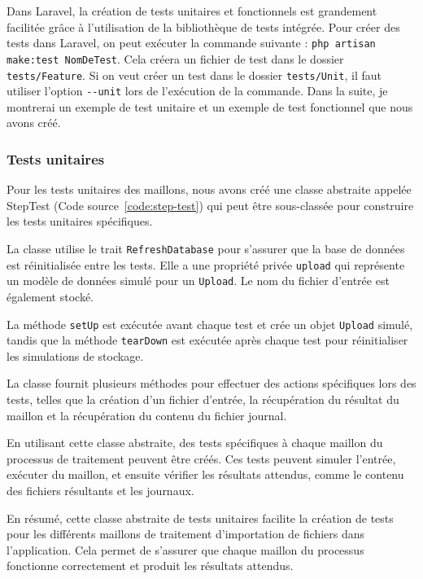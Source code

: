 Dans Laravel, la création de tests unitaires et fonctionnels est grandement facilitée grâce à l'utilisation de la bibliothèque de tests intégrée. Pour créer des tests dans Laravel, on peut exécuter la commande suivante : \Verb|php artisan make:test NomDeTest|. Cela créera un fichier de test dans le dossier \Verb|tests/Feature|. Si on veut créer un test dans le dossier \Verb|tests/Unit|, il faut utiliser l'option \Verb|--unit| lors de l'exécution de la commande. Dans la suite, je montrerai un exemple de test unitaire et un exemple de test fonctionnel que nous avons créé.

\subsubsection{Tests unitaires}

Pour les tests unitaires des maillons, nous avons créé une classe abstraite appelée StepTest (Code source~\ref{code:step-test}) qui peut être sous-classée pour construire les tests unitaires spécifiques.


La classe utilise le trait \Verb|RefreshDatabase| pour s'assurer que la base de données est réinitialisée entre les tests. Elle a une propriété privée \Verb|upload| qui représente un modèle de données simulé pour un \Verb|Upload|. Le nom du fichier d'entrée est également stocké.

La méthode \Verb|setUp| est exécutée avant chaque test et crée un objet \Verb|Upload| simulé, tandis que la méthode \Verb|tearDown| est exécutée après chaque test pour réinitialiser les simulations de stockage.

La classe fournit plusieurs méthodes pour effectuer des actions spécifiques lors des tests, telles que la création d'un fichier d'entrée, la récupération du résultat du maillon et la récupération du contenu du fichier journal.

En utilisant cette classe abstraite, des tests spécifiques à chaque maillon du processus de traitement peuvent être créés. Ces tests peuvent simuler l'entrée, exécuter du maillon, et ensuite vérifier les résultats attendus, comme le contenu des fichiers résultants et les journaux.

En résumé, cette classe abstraite de tests unitaires facilite la création de tests pour les différents maillons de traitement d'importation de fichiers dans l'application. Cela permet de s'assurer que chaque maillon du processus fonctionne correctement et produit les résultats attendus.

